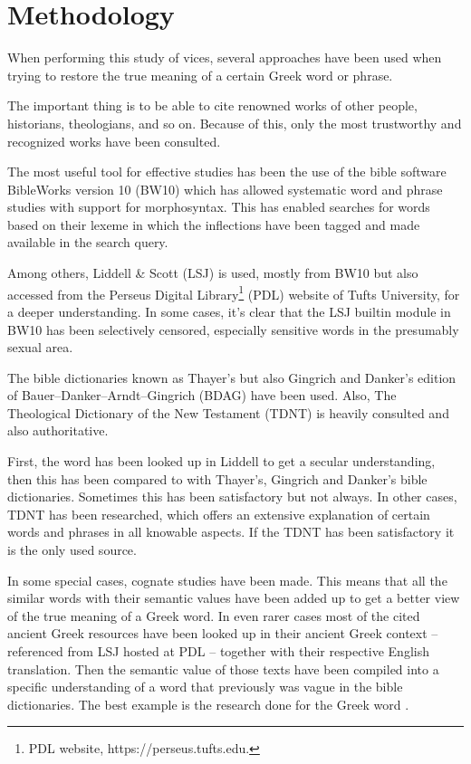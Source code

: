 \section{Methodology}

When performing this study of vices, several approaches have been used
when trying to restore the true meaning of a certain Greek word or phrase.

The important thing is to be able to cite renowned works of other people,
historians, theologians, and so on. Because of this, only the most trustworthy
and recognized works have been consulted.

The most useful tool for effective studies has been the use of the bible software
BibleWorks version 10 (BW10) which has allowed systematic word and phrase studies with 
support for morphosyntax. This has enabled searches for words based on their 
lexeme in which the inflections have been tagged and made available in the search query.
 
Among others, Liddell \& Scott (LSJ) is used, mostly from BW10 but also accessed from the
Perseus Digital Library\footnote{PDL website, https://perseus.tufts.edu.}
 (PDL) website of Tufts University, for a deeper understanding. 
In some cases, it's clear that the  LSJ builtin module in BW10 has been selectively 
censored, especially sensitive words in the presumably sexual area.

The bible dictionaries known as Thayer's but also Gingrich and Danker's edition
of Bauer–Danker–Arndt–Gingrich (BDAG) have been used. Also, The Theological Dictionary 
of the New Testament (TDNT) is heavily consulted and also authoritative.

First, the word has been looked up in Liddell to get a secular understanding,
then this has been compared to with Thayer's, Gingrich and Danker's bible dictionaries. 
Sometimes this has been satisfactory but not always. In other cases, 
TDNT has been researched, which offers an extensive explanation of certain words and
phrases in all knowable aspects. If the TDNT has been satisfactory it is the only used source.

In some special cases, cognate studies have been made. This means that all
the similar words with their semantic values have been added up to get a
better view of the true meaning of a Greek word. In even rarer cases most
of the cited ancient Greek resources have been looked up in their ancient
Greek context -- referenced from LSJ hosted at PDL -- together with their 
respective English translation. Then the semantic value of those texts have been compiled 
into a specific understanding of a word that previously was vague in the bible dictionaries. 
The best example is the research done for the Greek word .

